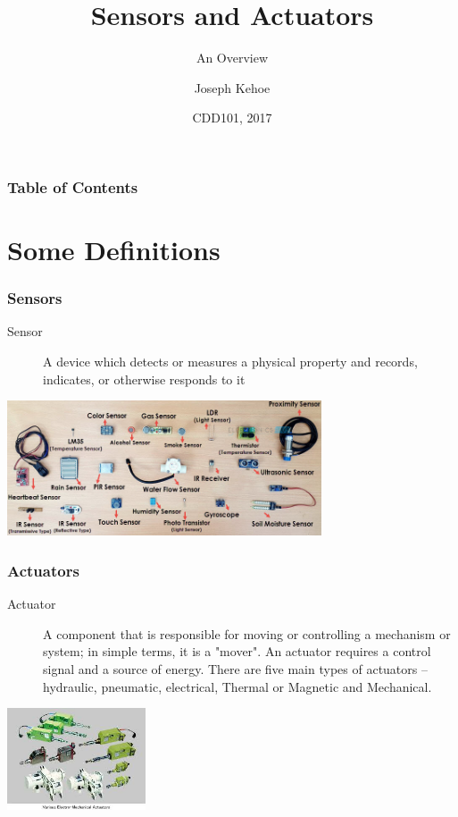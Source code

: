 \documentclass{beamer}
\title[Sensors and Actuators] %
{Sensors and Actuators}
\subtitle{An Overview}
\author[Dr. Joseph Kehoe] %
{Joseph Kehoe\inst{1}}
\institute[IT Carlow] %
{
	\inst{1}%
	Department of Computing and Networking\\
	Institute of Technology Carlow
}
\date[ITC 2017] %
{CDD101, 2017}
\begin{document}
 
\frame{\titlepage}
 
 
 
 \begin{frame}
 	\frametitle{Table of Contents}
 	\tableofcontents
 \end{frame}
 
 
 \section{Some Definitions}
 

  \begin{frame}
  	\frametitle{Sensors}
  	\begin{description}
  		\item[Sensor]A device which detects or measures a physical property and records, indicates, or otherwise responds to it
  	\end{description}
  	\includegraphics[height=4cm]{Types-of-Sensors.jpg}
  	
  \end{frame}

  \begin{frame}
  	\frametitle{Actuators}
  	\begin{description}
  		\item[Actuator] A component that is responsible for moving or controlling a mechanism or system; in simple terms, it is a "mover". An actuator requires a control signal and a source of energy. There are five main types of actuators – hydraulic, pneumatic, electrical, Thermal or Magnetic and Mechanical.
  	\end{description}
  	\includegraphics[height=3cm]{actuators.jpg}
  	
  \end{frame}
\end{document}
